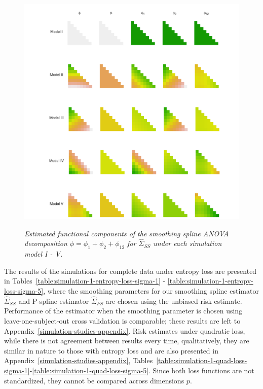 \begin{figure}[H] 
\caption{\textit{Estimated functional components of the smoothing spline ANOVA decomposition $\phi = \phi_1 + \phi_2 + \phi_{12}$ for $\hat{\Sigma}_{SS}$ under each simulation model I - V.}}
  \includegraphics[width = \textwidth]{img/chapter-4/ssanova-estimate-lattice} \label{fig:ssanova-component-lattice}
\end{figure}

\bigskip
The results of the simulations for complete data under entropy loss are presented in Tables~\ref{table:simulation-1-entropy-loss-sigma-1} - \ref{table:simulation-1-entropy-loss-sigma-5}, where the smoothing parameters for our smoothing spline estimator $\hat{\Sigma}_{SS}$ and P-spline estimator $\hat{\Sigma}_{PS}$ are chosen using the unbiased risk estimate. Performance of the estimator when the smoothing parameter is chosen using leave-one-subject-out cross validation is comparable; these results are left to Appendix~\ref{simulation-studies-appendix}. Risk estimates under quadratic loss, while there is not agreement between results every time, qualitatively, they are similar in nature to those with entropy loss and are also presented in Appendix~\ref{simulation-studies-appendix}, Tables~\ref{table:simulation-1-quad-loss-sigma-1}-\ref{table:simulation-1-quad-loss-sigma-5}. Since both loss functions are not standardized, they cannot be compared across dimensions $p$.

